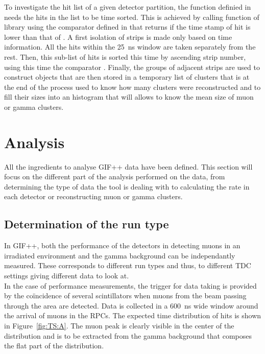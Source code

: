 	To investigate the hit list of a given detector partition, the function  definied in  needs the hits in the list to be time sorted. This is achieved by calling function  of library  using the comparator  defined in  that returns  if the time stamp of hit  is lower than that of . A first isolation of strips is made only based on time information. All the hits within the \SI{25}{ns} window are taken separately from the rest. Then, this sub-list of hits is sorted this time by ascending strip number, using this time the comparator . Finally, the groups of adjacent strips are used to construct  objects that are then stored in a temporary list of clusters that is at the end of the process used to know how many clusters were reconstructed and to fill their sizes into an histogram that will allows to know the mean size of muon or gamma clusters.\\
	
\section{Analysis}
\label{app2:sec:analysis}

	All the ingredients to analyse GIF++ data have been defined. This section will focus on the different part of the analysis performed on the data, from determining the type of data the tool is dealing with to calculating the rate in each detector or reconstructing muon or gamma clusters.

	\subsection{Determination of the run type}
	\label{app2:ssec:runtype}
	
	In GIF++, both the performance of the detectors in detecting muons in an irradiated environment and the gamma background can be independantly measured. These corresponds to different run types and thus, to different TDC settings giving different data to look at.\\
	
	In the case of performance measurements, the trigger for data taking is provided by the coïncidence of several scintillators when muons from the beam passing through the area are detected. Data is collected in a \SI{600}{ns} wide window around the arrival of muons in the RPCs. The expected time distribution of hits is shown in Figure~\ref{fig:TS:A}. The muon peak is clearly visible in the center of the distribution and is to be extracted from the gamma background that composes the flat part of the distribution.
	
